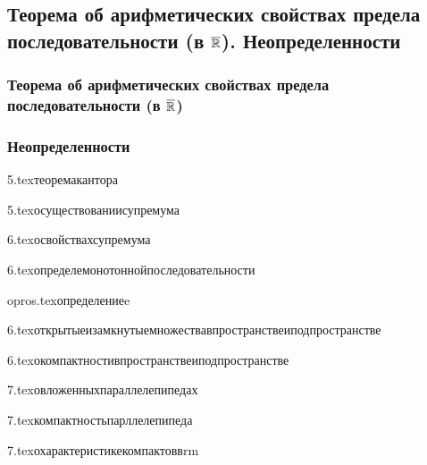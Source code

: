\subsection{\teormin Теорема об арифметических свойствах предела последовательности (в $\overline{\mathbb{R}}$). Неопределенности}
\subsubsection{Теорема об арифметических свойствах предела последовательности (в $\overline{\mathbb{R}}$)}
\subsubsection{Неопределенности}

{5.tex}{теоремакантора}

{5.tex}{осуществованиисупремума}

{6.tex}{освойствахсупремума}

{6.tex}{определемонотоннойпоследовательности}

{opros.tex}{определениеe}

{6.tex}{открытыеизамкнутыемножествавпространствеиподпространстве}

{6.tex}{окомпактностивпространствеиподпространстве}

{7.tex}{овложенныхпараллелепипедах}

{7.tex}{компактностьпарллелепипеда}

{7.tex}{охарактеристикекомпактоввrm}

